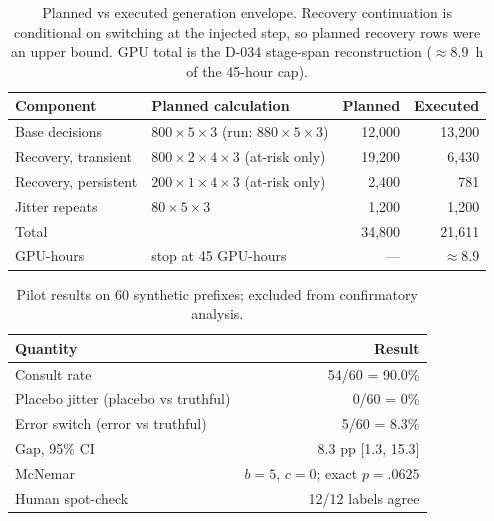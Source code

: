 \documentclass[a4paper,fleqn]{cas-sc}
\begin{document}
\begin{table}[pos=htbp]
  \centering
  \caption{Planned vs executed generation envelope. Recovery continuation is conditional on
  switching at the injected step, so planned recovery rows were an upper bound. GPU total is
  the D-034 stage-span reconstruction ($\approx$8.9~h of the 45-hour cap).}
  \label{tab:envelope}
  \small
  \begin{tabular}{>{\raggedright\arraybackslash}p{3.6cm}>{\raggedright\arraybackslash}p{4.6cm}rr}
    \toprule
    \textbf{Component} & \textbf{Planned calculation} & \textbf{Planned} & \textbf{Executed} \\
    \midrule
    Base decisions            & $800 \times 5 \times 3$ (run: $880 \times 5 \times 3$) & 12{,}000 & 13{,}200 \\
    Recovery, transient       & $800 \times 2 \times 4 \times 3$ (at-risk only)       & 19{,}200 & 6{,}430 \\
    Recovery, persistent      & $200 \times 1 \times 4 \times 3$ (at-risk only)       & 2{,}400  & 781 \\
    Jitter repeats            & $80 \times 5 \times 3$                                & 1{,}200  & 1{,}200 \\
    \midrule
    Total                     &                                                       & 34{,}800 & 21{,}611 \\
    GPU-hours                 & stop at 45 GPU-hours                                & ---       & $\approx$8.9 \\
    \bottomrule
  \end{tabular}
\end{table}

\begin{table}[pos=htbp]
  \centering
  \caption{Pilot results on 60 synthetic prefixes; excluded from confirmatory analysis.}
  \label{tab:pilot}
  \small
  \begin{tabular}{>{\raggedright\arraybackslash}p{7.4cm}r}
    \toprule
    \textbf{Quantity} & \textbf{Result} \\
    \midrule
    Consult rate                              & 54/60 = 90.0\% \\
    Placebo jitter (placebo vs truthful)      & 0/60 = 0\% \\
    Error switch (error vs truthful)          & 5/60 = 8.3\% \\
    Gap, 95\% CI                              & 8.3 pp [1.3, 15.3] \\
    McNemar                                   & $b=5$, $c=0$; exact $p=.0625$ \\
    Human spot-check                          & 12/12 labels agree \\
    \bottomrule
  \end{tabular}
\end{table}
\end{document}
